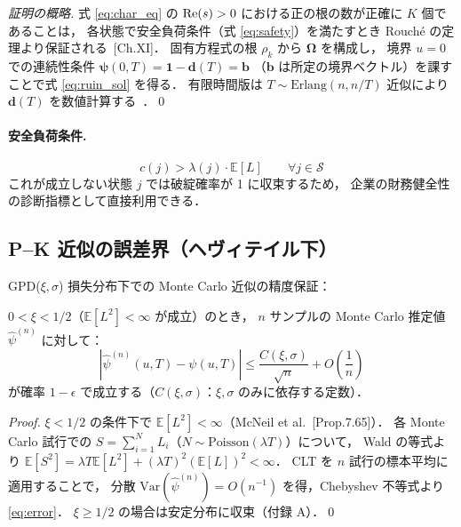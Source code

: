 \documentclass{ipsjlike}
\newcommand{\E}{\mathbb{E}}
\newcommand{\ruin}{\psi}
\newcommand{\abs}[1]{\left| #1 \right|}
\begin{document}
\begin{proof}[証明の概略]
  式 \eqref{eq:char_eq} の ${\rm Re}(s) > 0$ における正の根の数が正確に $K$ 個であることは，
  各状態で安全負荷条件（式 \eqref{eq:safety}）を満たすとき
  Rouch\'{e} の定理より保証される~\cite{asmussen2010ruin}[Ch.XI]．
  固有方程式の根 $\rho_k$ から $\bm{\Omega}$ を構成し，
  境界 $u = 0$ での連続性条件 $\bm{\ruin}(0,T) = \bm{1} - \bm{d}(T) = \bm{b}$
  （$\bm{b}$ は所定の境界ベクトル）を課すことで式 \eqref{eq:ruin_sol} を得る．
  有限時間版は $T \sim \mathrm{Erlang}(n, n/T)$ 近似により
  $\bm{d}(T)$ を数値計算する~\cite{ahn2005erlang}．\qed
\end{proof}

\paragraph{安全負荷条件.}
\begin{equation}
  c(j) > \lambda(j) \cdot \E[L] \qquad \forall j \in \mathcal{S}
  \label{eq:safety}
\end{equation}
これが成立しない状態 $j$ では破綻確率が 1 に収束するため，
企業の財務健全性の診断指標として直接利用できる．

\subsection{P--K 近似の誤差界（ヘヴィテイル下）}

GPD($\xi, \sigma$) 損失分布下での Monte Carlo 近似の精度保証：

\begin{proposition}[誤差界]\label{prop:error}
  $0 < \xi < 1/2$（$\E[L^2] < \infty$ が成立）のとき，
  $n$ サンプルの Monte Carlo 推定値 $\hat{\ruin}^{(n)}$ に対して：
  \begin{equation}
    \abs{\hat{\ruin}^{(n)}(u,T) - \ruin(u,T)} \leq \frac{C(\xi,\sigma)}{\sqrt{n}}
    + O\!\left(\frac{1}{n}\right)
    \label{eq:error}
  \end{equation}
  が確率 $1 - \epsilon$ で成立する（$C(\xi,\sigma)$：$\xi,\sigma$ のみに依存する定数）．
\end{proposition}

\begin{proof}
  $\xi < 1/2$ の条件下で $\E[L^2] < \infty$（McNeil et al.~\cite{mcneil2015}[Prop.7.65]）．
  各 Monte Carlo 試行での $S = \sum_{i=1}^{N} L_i$（$N \sim \mathrm{Poisson}(\lambda T)$）について，
  Wald の等式より $\E[S^2] = \lambda T \E[L^2] + (\lambda T)^2 (\E[L])^2 < \infty$．
  CLT を $n$ 試行の標本平均に適用することで，
  分散 $\mathrm{Var}(\hat{\ruin}^{(n)}) = O(n^{-1})$ を得，Chebyshev 不等式より \eqref{eq:error}．
  $\xi \geq 1/2$ の場合は安定分布に収束（付録 A）．\qed
\end{proof}
\end{document}
